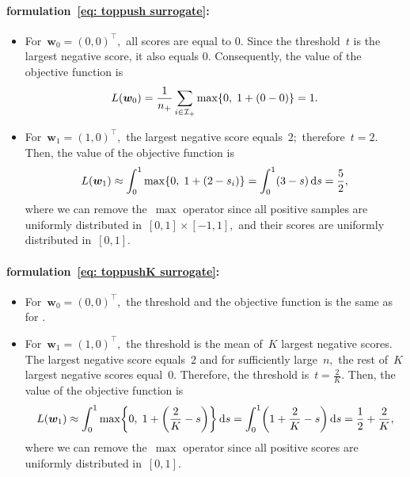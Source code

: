 \paragraph*{\TopPush formulation~\eqref{eq: toppush surrogate}:}
\begin{itemize}
  \item For~$\bm{w}_0 = (0,0)^{\top},$  all scores are equal to 0. Since the threshold~$t$ is the largest negative score, it also equals 0. Consequently, the value of the objective function is
  \begin{equation*}
    L(\bm{w}_0)
      = \frac{1}{\npos} \sum_{i \in \Ipos} \max\Brac[c]{0, \; 1 + (0 - 0)}
      = 1.
  \end{equation*}
  \item For~$\bm{w}_1 = (1,0)^{\top},$ the largest negative score equals~$2;$ therefore~$t = 2.$ Then, the value of the objective function is
  \begin{equation*}
    L(\bm{w}_1)
      \approx \int_{0}^{1} \max\Brac[c]{0, \; 1 + (2 - s_i)}
      = \int_{0}^{1} \Brac{3 - s} \dd{s}
      = \frac{5}{2},
  \end{equation*}
  where we can remove the~$\max$ operator since all positive samples are uniformly distributed in~$[0,1]\times[-1,1],$ and their scores are uniformly distributed in~$[0,1].$
\end{itemize}

\paragraph*{\TopPushK formulation~\eqref{eq: toppushK surrogate}:}
\begin{itemize}
  \item For~$\bm{w}_0 = (0,0)^{\top},$ the threshold and the objective function is the same as for \TopPush.
  \item For~$\bm{w}_1 = (1,0)^{\top},$ the threshold is the mean of~$K$ largest negative scores. The largest negative score equals~$2$ and for sufficiently large~$n,$ the rest of~$K$ largest negative scores equal~$0.$ Therefore, the threshold is~$t = \frac{2}{K}.$ Then, the value of the objective function is
  \begin{equation*}
    L(\bm{w}_1)
      \approx \int_{0}^{1} \max\Brac[c]{0, \; 1 + \Brac{\frac{2}{K} - s}} \dd{s}
      = \int_{0}^{1} \Brac{1 + \frac{2}{K} - s} \dd{s}
      = \frac{1}{2} + \frac{2}{K},
  \end{equation*}
  where we can remove the~$\max$ operator since all positive scores are uniformly distributed in~$[0,1].$
\end{itemize}

